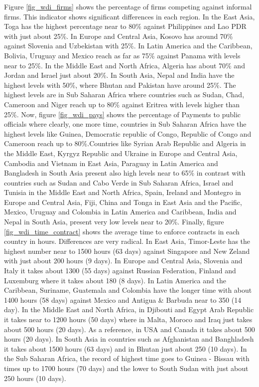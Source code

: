 Figure \ref{fig_wdi_firms} shows the percentage of firms competing against informal firms. This indicator shows significant differences in each region. In the East Asia, Toga has the highest percentage near to 80\% against Philippines and Lao PDR with just about 25\%. In Europe and Central Asia, Kosovo has around 70\% against Slovenia and Uzbekistan with 25\%. In Latin America and the Caribbean, Bolivia, Uruguay and Mexico reach as far as 75\% against Panama with levels near to 25\%. In the Middle East and North Africa, Algeria has about 70\% and Jordan and Israel just about 20\%. In South Asia, Nepal and India have the highest levels with 50\%, where Bhutan and Pakistan have around 25\%. The highest levels are in Sub Saharan Africa where countries such as Sudan, Chad, Cameroon and Niger reach up to 80\% against Eritrea with levels higher than 25\%.
Now, figure \ref{fig_wdi_pays} shows the percentage of Payments to public officials where clearly, one more time, countries in Sub Saharan Africa have the highest levels like Guinea, Democratic republic of Congo, Republic of Congo and Cameroon reach up to 80\%.Countries like Syrian Arab Republic and Algeria in the Middle East, Kyrgyz Republic and Ukraine in Europe and Central Asia, Cambodia and Vietnam in East Asia, Paraguay in Latin America and Bangladesh in South Asia present also high levels near to 65\% in contrast with countries such as Sudan and Cabo Verde in Sub Saharan Africa, Israel and Tunisia in the Middle East and North Africa, Spain, Ireland and Montegro in Europe and Central Asia, Fiji, China and Tonga in East Asia and the Pacific, Mexico, Uruguay and Colombia in Latin America and Caribbean, India and Nepal in South Asia, present very low levels near to 20\%.
Finally, figure \ref{fig_wdi_time_contract} shows the average time to enforce contracts in each country in hours. Differences are very radical. 
 In  East Asia, Timor-Leste has the highest number near to 1500 hours (63 days) against Singapore and New Zeland with just about 200 hours (9 days). In Europe and Central Asia, Slovenia and Italy it takes about 1300 (55 days) against Russian Federation, Finland and Luxemburg where it takes about 180 (8 days). In Latin America and the Caribbean, Suriname, Guatemala and Colombia have the longer time with about 1400 hours (58 days) against Mexico and Antigua \& Barbuda near to 350 (14 day). In the Middle East and North Africa,  in Djibouti and Egypt Arab Republic it takes near to 1200 hours (50 days) where in Malta, Moroco and Iraq just takes about 500 hours (20 days). As a reference, in USA and Canada it takes about 500 hours (20 days). In South Asia in countries such as Afghanistan and Banghladesh it takes about 1500 hours (63 days) and in Bhutan just about 250 (10 days). In the Sub Saharan Africa, the record of highest time goes to Guinea - Bissau with times up to 1700 hours (70 days) and the lower to South Sudan with just about 250 hours (10 days).

